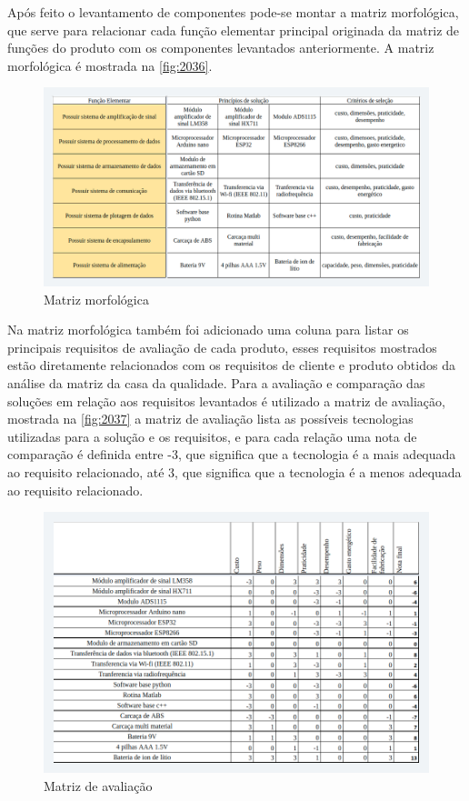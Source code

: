 Após feito o levantamento de componentes pode-se montar a matriz morfológica, que serve para relacionar cada função elementar principal originada da matriz de
funções do produto com os componentes levantados anteriormente.
A matriz morfológica é mostrada na \autoref{fig:2036}.

\begin{figure}[H]
	\caption{\label{fig:2036} Matriz morfológica}
	\begin{center}
		\includegraphics[width=\textwidth]{pictures/2036.png}
	\end{center}
\end{figure}

Na matriz morfológica também foi adicionado uma coluna para listar os principais requisitos de avaliação de cada produto, esses requisitos mostrados estão diretamente
relacionados com os requisitos de cliente e produto obtidos da análise da matriz da casa da qualidade.
Para a avaliação e comparação das soluções em relação aos requisitos levantados é utilizado a matriz de avaliação, mostrada na \autoref{fig:2037} a matriz de avaliação
lista as possíveis tecnologias utilizadas para a solução e os requisitos, e para cada relação uma nota de comparação é definida entre -3, que significa que a tecnologia
é a mais adequada ao requisito relacionado, até 3, que significa que a tecnologia é a menos adequada ao requisito relacionado.

\begin{figure}[H]
	\caption{\label{fig:2037} Matriz de avaliação}
	\begin{center}
		\includegraphics[width=\textwidth]{pictures/2037.png}
	\end{center}
\end{figure}

